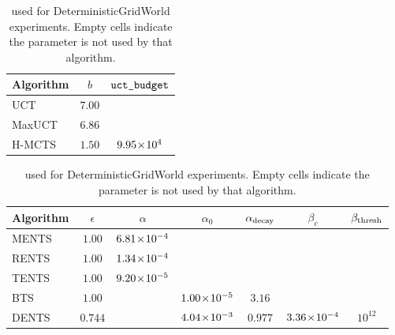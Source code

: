     \begin{table}[tbp]
        \centering
        \begin{subtable}{\textwidth}
            \centering
            \begin{tabular}{l|c|c}
                Algorithm & $b$ & ${\texttt{uct\_budget}}$ \\
                \hline
                UCT     & $7.00$ & \\
                MaxUCT  & $6.86$ & \\
                H-MCTS  & $1.50$ & $9.95\!\times\!10^{4}$ \\
            \end{tabular}
            \caption{UCT-based search algorithms.}
        \end{subtable}
    
        \vspace{1em}
    
        \begin{subtable}{\textwidth}
            \centering
            \begin{tabular}{l|c|c|c|c|c|c}
                Algorithm
                    & $\epsilon$
                    & $\alpha$
                    & $\alpha_0$
                    & ${\alpha_{\text{decay}}}$
                    & $\beta_c$
                    & ${\beta_{\text{thresh}}}$ \\
                \hline
                MENTS & $1.00$ & $6.81\!\times\!10^{-4}$ & & & & \\
                RENTS & $1.00$ & $1.34\!\times\!10^{-4}$ & & & & \\
                TENTS & $1.00$ & $9.20\!\times\!10^{-5}$ & & & & \\
                BTS   & $1.00$ & & $1.00\!\times\!10^{-5}$ & $3.16$ & & \\
                DENTS & $0.744$ & & $4.04\!\times\!10^{-3}$ & $0.977$ 
                    & $3.36\!\times\!10^{-4}$ & $10^{12}$ \\
            \end{tabular}
            \caption{Boltzmann-based search algorithms.}
            \label{table:gridworld_params:b}
        \end{subtable}
    
        \caption[ for DeterministicGridWorld experiments.]{ used for  DeterministicGridWorld experiments. Empty cells indicate the parameter is not used by that algorithm.}
        \label{table:gridworld_params}
    \end{table}



